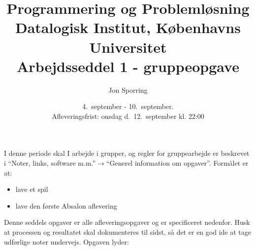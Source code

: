 \documentclass[a4paper,12pt]{article}
\title{Programmering og Problemløsning\\Datalogisk Institut,
  Københavns Universitet\\Arbejdsseddel 1 - gruppeopgave}
\author{Jon Sporring}
\date{4.\ september - 10.\ september.\\Afleveringsfrist: onsdag d.\ 12.\ september kl. 22:00}
\begin{document}
\maketitle

I denne periode skal I arbejde i grupper, og regler for gruppearbejde er beskrevet i "`Noter, links, software m.m."'$\rightarrow$"`Generel information om opgaver"'. Formålet er at:
\begin{itemize}
\item lave et spil
\item lave den første Absalon aflevering
\end{itemize}

Denne seddels opgaver er alle afleveringsopgaver og er specificeret nedenfor. Husk at processen og resultatet skal dokumenteres til sidst, så det er en god ide at tage udførlige noter undervejs. Opgaven lyder:
\end{document}

